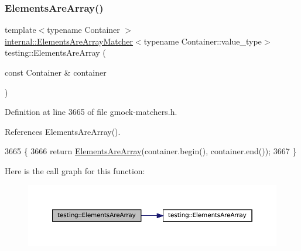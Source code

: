 \subsubsection{\texorpdfstring{Elements\+Are\+Array()}{ElementsAreArray()}\hspace{0.1cm}{\footnotesize\ttfamily [4/4]}}
{\footnotesize\ttfamily template$<$typename Container $>$ \\
\hyperlink{classtesting_1_1internal_1_1ElementsAreArrayMatcher}{internal\+::\+Elements\+Are\+Array\+Matcher}$<$typename Container\+::value\+\_\+type$>$ testing\+::\+Elements\+Are\+Array (\begin{DoxyParamCaption}\item[{const Container \&}]{container }\end{DoxyParamCaption})\hspace{0.3cm}{\ttfamily [inline]}}



Definition at line 3665 of file gmock-\/matchers.\+h.



References Elements\+Are\+Array().


\begin{DoxyCode}
3665                                              \{
3666   \textcolor{keywordflow}{return} \hyperlink{namespacetesting_ad257747adbe056feaa92f449063d681f}{ElementsAreArray}(container.begin(), container.end());
3667 \}
\end{DoxyCode}
Here is the call graph for this function\+:
\nopagebreak
\begin{figure}[H]
\begin{center}
\leavevmode
\includegraphics[width=350pt]{namespacetesting_ad257747adbe056feaa92f449063d681f_cgraph}
\end{center}
\end{figure}
\mbox{\label{namespacetesting_aec11c4e418a835ca2c0c3cbdb29b28ba}} 
